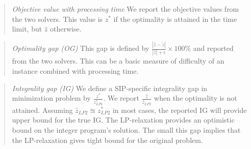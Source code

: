 \begin{quote}
	\noindent\textit{Objective value with processing time} We report the objective values from the two solvers. This value is $z^*$ if the optimality is attained in the time limit, but $\hat{z}$ otherwise.
\end{quote}

\begin{quote}
	\noindent\textit{Optimality gap (OG)} This gap is defined by $\frac{|\hat{z}-\tilde{z}|}{|\hat{z}|+\epsilon}\times 100\%$ and  reported from the two solvers. This can be a basic measure of difficulty of an instance combined with processing time.
\end{quote}


\begin{quote}
	\noindent\textit{Integrality gap (IG)} We define a SIP-specific integrality gap in minimization problem by $\frac{z^*}{z^*_{LP2}}$. We report $\frac{\hat{z}}{\hat{z}_{LP2}}$ when the optimality is not attained. Assuming $\hat{z}_{LP2}\approxeq z^*_{LP2}$ in most cases, the reported IG will provide upper bound for the true IG. The LP-relaxation provides an optimistic bound on the integer program's solution. The small this gap implies that the LP-relaxation gives tight bound for the original problem.  %
\end{quote}

